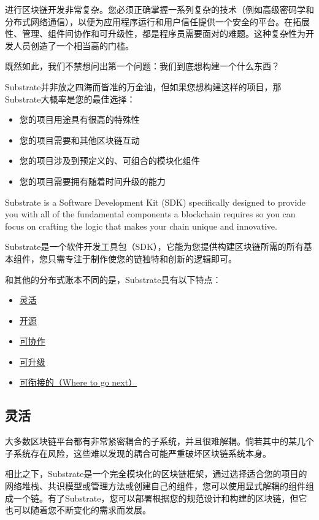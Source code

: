 进行区块链开发非常复杂。您必须正确掌握一系列复杂的技术（例如高级密码学和分布式网络通信），以便为应用程序运行和用户信任提供一个安全的平台。在拓展性、管理、组件间协作和可升级性，都是程序员需要面对的难题。这种复杂性为开发人员创造了一个相当高的门槛。

既然如此，我们不禁想问出第一个问题：我们到底想构建一个什么东西？

Substrate并非放之四海而皆准的万金油，但如果您想构建这样的项目，那Substrate大概率是您的最佳选择：

\begin{itemize}
\item
  您的项目用途具有很高的特殊性
\item
  您的项目需要和其他区块链互动
\item
  您的项目涉及到预定义的、可组合的模块化组件
\item
  您的项目需要拥有随着时间升级的能力
\end{itemize}

Substrate is a Software Development Kit (SDK) specifically designed to
provide you with all of the fundamental components a blockchain requires
so you can focus on crafting the logic that makes your chain unique and
innovative.

Substrate是一个软件开发工具包（SDK），它能为您提供构建区块链所需的所有基本组件，您只需专注于制作使您的链独特和创新的逻辑即可。

和其他的分布式账本不同的是，Substrate具有以下特点：

\begin{itemize}
\item
  \protect\hyperlink{}{灵活}
\item
  \protect\hyperlink{}{开源}
\item
  \protect\hyperlink{}{可协作}
\item
  \protect\hyperlink{}{可升级}
\item
  \protect\hyperlink{}{可衔接的（Where to go next）}
\end{itemize}

\hypertarget{ux7075ux6d3b}{%
\subsection{灵活}\label{ux7075ux6d3b}}

大多数区块链平台都有非常紧密耦合的子系统，并且很难解耦。倘若其中的某几个子系统存在风险，这些难以发现的耦合可能严重破坏区块链系统本身。

相比之下，Substrate是一个完全模块化的区块链框架，通过选择适合您的项目的网络堆栈、共识模型或管理方法或创建自己的组件，您可以使用显式解耦的组件组成一个链。有了Substrate，您可以部署根据您的规范设计和构建的区块链，但它也可以随着您不断变化的需求而发展。

